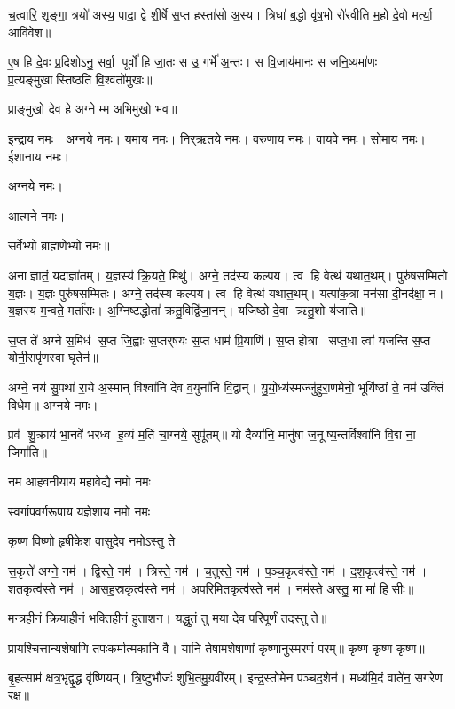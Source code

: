 
च॒त्वारि॒ शृङ्गा॒ त्रयो॑ अस्य॒ पादा॒ द्वे शी॒र्\mbox{}षे स॒प्त हस्ता॑सो अ॒स्य। त्रिधा॑ ब॒द्धो वृ॑ष॒भो रो॑रवीति म॒हो दे॒वो मर्त्या॒ आवि॑वेश॥

ए॒ष हि दे॒वः प्र॒दिशोऽनु॒ सर्वा॒ पूर्वो॑ हि जा॒तः स उ॒ गर्भे॑ अ॒न्तः। स वि॒जाय॑मानः स जनि॒ष्यमा॑णः प्र॒त्यङ्मुखास्तिष्ठति वि॒श्वतो॑मुखः॥ 

प्राङ्मुखो देव हे अग्ने म्म अभिमुखो भव॥

इन्द्राय नमः। अग्नये नमः। यमाय नमः। निर्‌ऋतये नमः। 
वरुणाय नमः। वायवे नमः। सोमाय नमः। ईशानाय नमः। 

अग्नये नमः। 

आत्मने नमः। 

सर्वेभ्यो ब्राह्मणेभ्यो नमः॥

अनाज्ञातं॒ यदाज्ञा॑तम्।
य॒ज्ञस्य॑ क्रि॒यते॒ मिथु॑।
अग्ने॒ तद॑स्य कल्पय।
त्व हि वेत्थ॑ यथात॒थम्।
पुरु॑षसम्मितो य॒ज्ञः।
य॒ज्ञः पुरु॑षसम्मितः।
अग्ने॒ तद॑स्य कल्पय।
त्व हि वेत्थ॑ यथात॒थम्।
यत्पा॑क॒त्रा मन॑सा दी॒नद॑क्षा॒ न।
य॒ज्ञस्य॑ म॒न्वते॒ मर्ता॑सः।
अ॒ग्निष्टद्धोता॑ क्रतु॒विद्वि॑जा॒नन्।
यजि॑ष्ठो दे॒वा ऋ॑तु॒शो य॑जाति॥

स॒प्त ते॑ अग्ने स॒मिध॑ स॒प्त जि॒ह्वाः स॒प्तर्‌ष॑यः स॒प्त धाम॑ प्रि॒याणि॑। स॒प्त होत्रा सप्त॒धा त्वा॑ यजन्ति स॒प्त योनी॒रापृ॑णस्वा घृ॒तेन॑॥



अग्ने॒ नय॑ सु॒पथा॑ रा॒ये अ॒स्मान् विश्वा॑नि देव व॒युना॑नि वि॒द्वान्। यु॒यो॒ध्य॑स्मज्जु॑हुरा॒णमेनो॒ भूयि॑ष्ठां ते॒ नम॑ उक्तिं विधेम॥ अग्नये नमः।

प्रव॑ शु॒क्राय॑ भा॒नवे॑ भरध्व ह॒व्यं म॒तिं चा॒ग्नये॒ सुपू॑तम्॥ यो दैव्या॑नि॒ मानु॑षा ज॒नूष्य॒न्तर्विश्वा॑नि वि॒द्म ना॒ जिगा॑ति॥


{नम आहवनीयाय महावेद्यै नमो नमः}

{स्वर्गापवर्गरूपाय यज्ञेशाय नमो नमः}

{कृष्ण विष्णो हृषीकेश वासुदेव नमोऽस्तु ते}


स॒कृत्ते॑ अग्ने॒ नम॑। द्विस्ते॒ नम॑। त्रिस्ते॒ नम॑। च॒तुस्ते॒ नम॑। प॒ञ्च॒कृत्व॑स्ते॒ नम॑। द॒श॒कृत्व॑स्ते॒ नम॑। श॒त॒कृत्व॑स्ते॒ नम॑। आ॒स॒ह॒स्र॒कृत्व॑स्ते॒ नम॑। अ॒प॒रि॒मि॒त॒कृत्व॑स्ते॒ नम॑। नम॑स्ते अस्तु॒ मा मा॑ हिसीः॥


मन्त्रहीनं क्रियाहीनं भक्तिहीनं हुताशन।
यद्धुतं तु मया देव परिपूर्णं तदस्तु ते॥

प्रायश्चित्तान्यशेषाणि तपःकर्मात्मकानि वै।
यानि तेषामशेषाणां कृष्णानुस्मरणं परम्॥
कृष्ण कृष्ण कृष्ण॥

बृ॒हत्साम॑ क्षत्र॒भृद्वृ॒द्ध वृ॑ष्णियम्। त्रि॒ष्टुभौजः॑ शुभि॒तमु॒ग्रवी॑रम्।
इन्द्र॒स्तोमे॑न पञ्चद॒शेन॑। मध्य॑मि॒दं वाते॑न॒ सग॑रेण रक्ष॥

